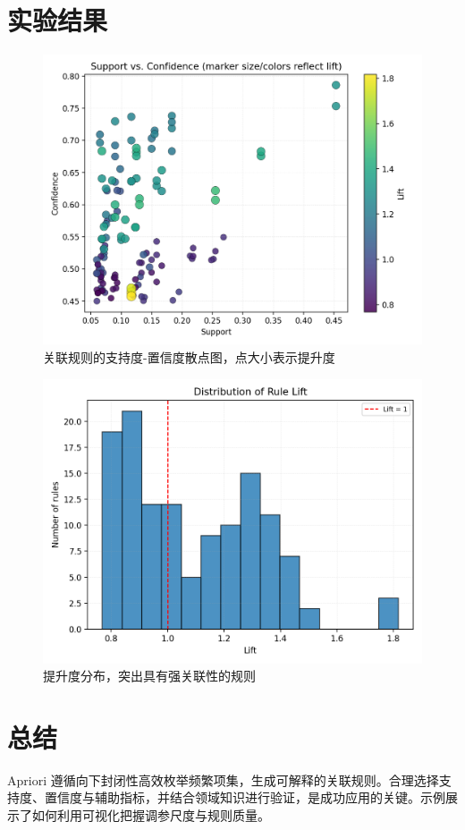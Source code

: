 \documentclass[UTF8,zihao=-4]{ctexart}
\begin{document}
\section{实验结果}
\begin{figure}[H]
  \centering
  \includegraphics[width=0.82\linewidth]{apriori_support_confidence.png}
  \caption{关联规则的支持度-置信度散点图，点大小表示提升度}
  \label{fig:apriori_support_confidence_cn}
\end{figure}

\begin{figure}[H]
  \centering
  \includegraphics[width=0.78\linewidth]{apriori_lift_distribution.png}
  \caption{提升度分布，突出具有强关联性的规则}
  \label{fig:apriori_lift_distribution_cn}
\end{figure}

\FloatBarrier
\section{总结}
Apriori 遵循向下封闭性高效枚举频繁项集，生成可解释的关联规则。合理选择支持度、置信度与辅助指标，并结合领域知识进行验证，是成功应用的关键。示例展示了如何利用可视化把握调参尺度与规则质量。
\end{document}

